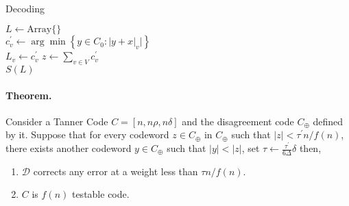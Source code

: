 \documentclass{article}
\begin{document}
\begin{multicols*}{2}
\paragraph{}
\begin{algorithm}[H]
  \caption{Decoding}
  \label{alg:three}
$ L \leftarrow \text{Array} \{ \} $\\
   {
  $c^{\prime}_{v} \leftarrow \arg\min {\left\{  y \in C_{0} : |y + x|_{v} |  \right\} } $\\
  $ L_{v} \leftarrow c^{\prime}_{v}$
 }
 $ z \leftarrow \sum_{v \in V}{c^{\prime}_{v}} $\\
 \Return  $S(L) $
 
\end{algorithm}

\paragraph{Theorem.} Consider a Tanner Code $C = [n, n\rho, n\delta]$ and the disagreement code $C_{\oplus}$ defined by it. Suppose that for every codeword $ z \in C_{\oplus}$ in $C_{\oplus}$ such that $|z| < \tau^{\prime} n / f\left(n\right)$, there exists another codeword $y \in C_{\oplus} $ such that $|y| < |z|$, set $\tau \leftarrow \frac{\tau^{\prime} }{6 \Delta} \delta$ then, 

\begin{enumerate}
  \item $\mathcal{D}$ corrects any error at a weight less than $\tau n / f\left(n\right)$.   
  \item $C$ is $f\left( n \right)$ testable code.
\end{enumerate}



\end{multicols*}
\end{document}
